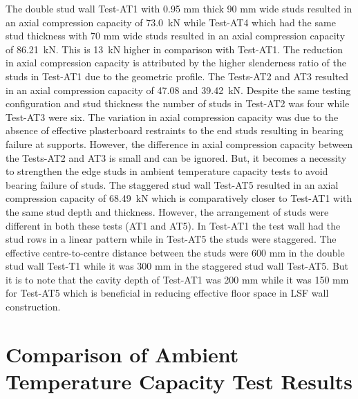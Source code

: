The double stud wall Test-AT1 with 0.95 mm thick 90 mm wide studs resulted in an axial compression capacity of 73.0~kN while Test-AT4 which had the same stud thickness with 70 mm wide studs resulted in an axial compression capacity of 86.21~kN. This is 13~kN higher in comparison with Test-AT1. The reduction in axial compression capacity is attributed by the higher slenderness ratio of the studs in Test-AT1 due to the geometric profile. The Tests-AT2 and AT3 resulted in an axial compression capacity of 47.08 and 39.42~kN. Despite the same testing configuration and stud thickness the number of studs in Test-AT2 was four while Test-AT3 were six. The variation in axial compression capacity was due to the absence of effective plasterboard restraints to the end studs resulting in bearing failure at supports. However, the difference in axial compression capacity between the Tests-AT2 and AT3 is small and can be ignored. But, it becomes a necessity to strengthen the edge studs in ambient temperature capacity tests to avoid bearing failure of studs. The staggered stud wall Test-AT5 resulted in an axial compression capacity of 68.49~kN which is comparatively closer to Test-AT1 with the same stud depth and thickness. However, the arrangement of studs were different in both these tests (AT1 and AT5). In Test-AT1 the test wall had the stud rows in a linear pattern while in Test-AT5 the studs were staggered. The effective centre-to-centre distance between the studs were 600 mm in the double stud wall Test-T1 while it was 300 mm in the staggered stud wall Test-AT5. But it is to note that the cavity depth of Test-AT1 was 200 mm while it was 150 mm for Test-AT5 which is beneficial in reducing effective floor space in LSF wall construction.

\section{Comparison of Ambient Temperature Capacity Test Results}

